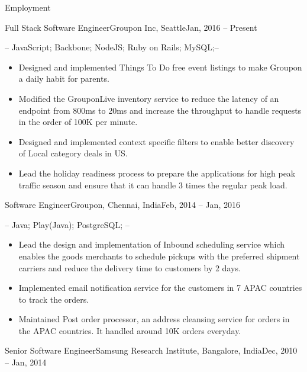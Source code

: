 \documentclass[]{mcdowellcv}
\begin{document}
	\makeheader
	\begin{cvsection}{Employment}
		\begin{cvsubsection}{Full Stack Software Engineer}{Groupon Inc, Seattle}{Jan, 2016 -- Present}
			\item {} -- JavaScript; Backbone; NodeJS; Ruby on Rails;  MySQL;--
			\begin{itemize}
			 	\item Designed and implemented Things To Do free event listings to make Groupon a daily habit for parents.
				\item Modified the GrouponLive inventory service to reduce the latency of an endpoint from 800ms to 20ms and increase the throughput to handle requests in the order of 100K per minute.
				\item Designed and implemented context specific filters to enable better discovery of Local category deals in US.
				\item Lead the holiday readiness process to prepare the applications for high peak traffic season and ensure that it can handle 3 times the regular peak load.
			\end{itemize}
		\end{cvsubsection}

		\begin{cvsubsection}{Software Engineer}{Groupon, Chennai, India}{Feb, 2014 -- Jan, 2016}
			\item {} -- Java; Play(Java); PostgreSQL; --
			\begin{itemize}
				\item  Lead the design and implementation of Inbound scheduling service which enables the goods merchants to schedule pickups with the preferred shipment carriers and reduce the delivery time to customers by 2 days.
				\item Implemented email notification service for the customers in 7 APAC countries to track the orders.
				\item Maintained Post order processor, an address cleansing service for orders in the APAC countries. It handled around 10K orders everyday.
			\end{itemize}
		\end{cvsubsection}

		\begin{cvsubsection}{Senior Software Engineer}{Samsung Research Institute, Bangalore, India}{Dec, 2010 -- Jan, 2014}


\end{cvsubsection}
\end{cvsection}
\end{document}
